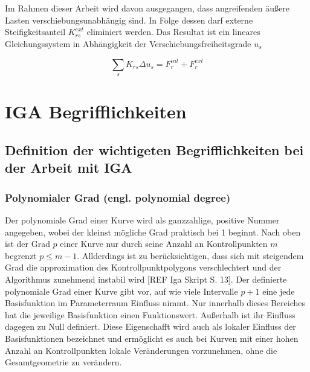 \documentclass[german,a4paper,12pt,oneside]{scrbook}
\theoremstyle{definition}
\theoremstyle{definition}
\theoremstyle{definition}
\theoremstyle{definition}
\theoremstyle{definition}
\theoremstyle{definition}
\begin{document}
\vspace{0.5cm}
Im Rahmen dieser Arbeit wird davon ausgegangen, dass angreifenden äußere Lasten verschiebungsunabhängig sind. In Folge dessen darf externe Steifigkeitsanteil $K_{rs}^{ext}$ eliminiert werden. Das Resultat ist ein lineares Gleichungssystem in Abhängigkeit der Verschiebungsfreiheitsgrade $u_s$ 

\begin{equation}
    \sum_{s} K_{rs} \Delta u_s = F_r^{int} + F_r^{ext}
\end{equation}












\chapter{IGA Begrifflichkeiten}  \setcounter{page}{1}   %

\section{Definition der wichtigeten Begrifflichkeiten bei der Arbeit mit IGA}

\subsection{Polynomialer Grad (engl. polynomial degree)}
Der polynomiale Grad einer Kurve wird als ganzzahlige, positive Nummer angegeben, wobei der kleinst mögliche Grad praktisch bei 1 beginnt. Nach oben ist der Grad $p$ einer Kurve nur durch seine Anzahl an Kontrollpunkten $m$ begrenzt $p \leq m - 1$. Allderdings ist zu berücksichtigen, dass sich mit steigendem Grad die approximation des Kontrollpunktpolygons verschlechtert und der Algorithmus zunehmend instabil wird [REF Iga Skript S. 13]. Der definierte polynomiale Grad einer Kurve gibt vor, auf wie viele Intervalle $p+1$ eine jede Basisfunktion im Parameterraum Einfluss nimmt. Nur innerhalb dieses Bereiches hat die jeweilige Basisfunktion einen Funktionswert. Außerhalb ist ihr Einfluss dagegen zu Null definiert. Diese Eigenschafft wird auch als lokaler Einfluss der Basisfunktionen bezeichnet und ermöglicht es auch bei Kurven mit einer hohen Anzahl an Kontrollpunkten lokale Veränderungen vorzunehmen, ohne die Gesamtgeometrie zu verändern.
\end{document}
